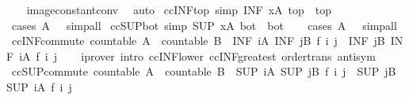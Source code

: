 \begin{isabellebody}
%
\isadelimproof
\ \ %
\endisadelimproof
%
\isatagproof
{}\isamarkupfalse%
\ image{\isacharunderscore}constant{\isacharunderscore}conv\ \isamarkupfalse%
\ auto%
\endisatagproof
{\isafoldproof}%
%
\isadelimproof
\isanewline
%
\endisadelimproof
\isanewline
{}\isamarkupfalse%
\ ccINF{\isacharunderscore}top\ {\isacharbrackleft}simp{\isacharbrackright}{\isacharcolon}\ {\isachardoublequoteopen}{\isacharparenleft}INF\ x{\isacharcolon}A{\isachardot}\ top{\isacharparenright}\ {\isacharequal}\ top{\isachardoublequoteclose}\isanewline
%
\isadelimproof
\ \ %
\endisadelimproof
%
\isatagproof
{}\isamarkupfalse%
\ {\isacharparenleft}cases\ {\isachardoublequoteopen}A\ {\isacharequal}\ {\isacharbraceleft}{\isacharbraceright}{\isachardoublequoteclose}{\isacharparenright}\ simp{\isacharunderscore}all%
\endisatagproof
{\isafoldproof}%
%
\isadelimproof
\isanewline
%
\endisadelimproof
\isanewline
{}\isamarkupfalse%
\ ccSUP{\isacharunderscore}bot\ {\isacharbrackleft}simp{\isacharbrackright}{\isacharcolon}\ {\isachardoublequoteopen}{\isacharparenleft}SUP\ x{\isacharcolon}A{\isachardot}\ bot{\isacharparenright}\ {\isacharequal}\ bot{\isachardoublequoteclose}\isanewline
%
\isadelimproof
\ \ %
\endisadelimproof
%
\isatagproof
{}\isamarkupfalse%
\ {\isacharparenleft}cases\ {\isachardoublequoteopen}A\ {\isacharequal}\ {\isacharbraceleft}{\isacharbraceright}{\isachardoublequoteclose}{\isacharparenright}\ simp{\isacharunderscore}all%
\endisatagproof
{\isafoldproof}%
%
\isadelimproof
\isanewline
%
\endisadelimproof
\isanewline
{}\isamarkupfalse%
\ ccINF{\isacharunderscore}commute{\isacharcolon}\ {\isachardoublequoteopen}countable\ A\ {\isasymLongrightarrow}\ countable\ B\ {\isasymLongrightarrow}\ {\isacharparenleft}INF\ i{\isacharcolon}A{\isachardot}\ INF\ j{\isacharcolon}B{\isachardot}\ f\ i\ j{\isacharparenright}\ {\isacharequal}\ {\isacharparenleft}INF\ j{\isacharcolon}B{\isachardot}\ INF\ i{\isacharcolon}A{\isachardot}\ f\ i\ j{\isacharparenright}{\isachardoublequoteclose}\isanewline
%
\isadelimproof
\ \ %
\endisadelimproof
%
\isatagproof
{}\isamarkupfalse%
\ {\isacharparenleft}iprover\ intro{\isacharcolon}\ ccINF{\isacharunderscore}lower\ ccINF{\isacharunderscore}greatest\ order{\isacharunderscore}trans\ antisym{\isacharparenright}%
\endisatagproof
{\isafoldproof}%
%
\isadelimproof
\isanewline
%
\endisadelimproof
\isanewline
{}\isamarkupfalse%
\ ccSUP{\isacharunderscore}commute{\isacharcolon}\ {\isachardoublequoteopen}countable\ A\ {\isasymLongrightarrow}\ countable\ B\ {\isasymLongrightarrow}\ {\isacharparenleft}SUP\ i{\isacharcolon}A{\isachardot}\ SUP\ j{\isacharcolon}B{\isachardot}\ f\ i\ j{\isacharparenright}\ {\isacharequal}\ {\isacharparenleft}SUP\ j{\isacharcolon}B{\isachardot}\ SUP\ i{\isacharcolon}A{\isachardot}\ f\ i\ j{\isacharparenright}{\isachardoublequoteclose}\isanewline

\end{isabellebody}

